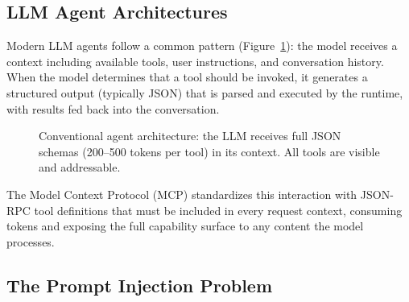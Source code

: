 \documentclass[acmsmall,screen,review]{acmart}
\begin{document}
\subsection{LLM Agent Architectures}

Modern LLM agents follow a common pattern (Figure~\ref{fig:conventional}): the model receives a context including available tools, user instructions, and conversation history. When the model determines that a tool should be invoked, it generates a structured output (typically JSON) that is parsed and executed by the runtime, with results fed back into the conversation.

\begin{figure}[h]
\centering
{}
\caption{Conventional agent architecture: the LLM receives full JSON schemas (200--500 tokens per tool) in its context. All tools are visible and addressable.}
\label{fig:conventional}
\end{figure}

The Model Context Protocol (MCP) standardizes this interaction with JSON-RPC tool definitions that must be included in every request context, consuming tokens and exposing the full capability surface to any content the model processes.

\subsection{The Prompt Injection Problem}
\end{document}
